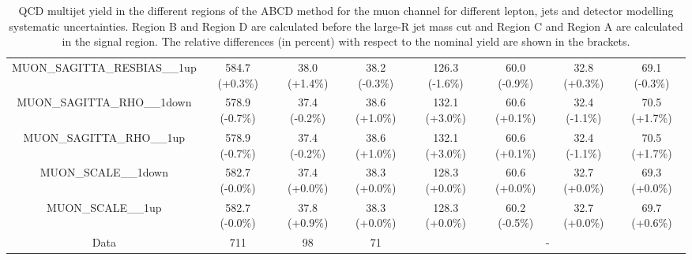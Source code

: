 \begin{table}[htbp!]
\begin{tiny}
\begin{center}
\begin{tabular}{c|c|c|c||c|c|c|c}
MUON\_SAGITTA\_RESBIAS\_\_1up                                & 584.7     (+0.3\%) & 38.0      (+1.4\%) & 38.2      (-0.3\%) & 126.3     (-1.6\%) & 60.0      (-0.9\%) & 32.8      (+0.3\%) & 69.1      (-0.3\%) \\ 
MUON\_SAGITTA\_RHO\_\_1down                                  & 578.9     (-0.7\%) & 37.4      (-0.2\%) & 38.6      (+1.0\%) & 132.1     (+3.0\%) & 60.6      (+0.1\%) & 32.4      (-1.1\%) & 70.5      (+1.7\%) \\ 
MUON\_SAGITTA\_RHO\_\_1up                                    & 578.9     (-0.7\%) & 37.4      (-0.2\%) & 38.6      (+1.0\%) & 132.1     (+3.0\%) & 60.6      (+0.1\%) & 32.4      (-1.1\%) & 70.5      (+1.7\%) \\ 
MUON\_SCALE\_\_1down                                         & 582.7     (-0.0\%) & 37.4      (+0.0\%) & 38.3      (+0.0\%) & 128.3     (+0.0\%) & 60.6      (+0.0\%) & 32.7      (+0.0\%) & 69.3      (+0.0\%) \\ 
MUON\_SCALE\_\_1up                                           & 582.7     (-0.0\%) & 37.8      (+0.9\%) & 38.3      (+0.0\%) & 128.3     (+0.0\%) & 60.2      (-0.5\%) & 32.7      (+0.0\%) & 69.7      (+0.6\%) \\ 
\hline 
\hline 
Data                                                        & 711  & 98   & 71  &\multicolumn{4}{c}{-} \\  
\hline  
\end{tabular}
\end{center}
\caption{QCD multijet yield in the different regions of the ABCD method for the muon channel for 
different lepton, jets and \met detector modelling systematic uncertainties. Region B and Region D are calculated before the large-R jet mass cut 
and Region C and Region A are calculated in the signal region. The relative differences (in percent) with respect to the nominal yield are shown in the 
brackets.} 
\label{tab:boosted_qcd_detsyst_muon_sr_1}
\end{tiny}
\end{table} 
%
%

